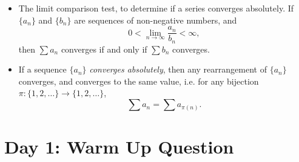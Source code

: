 \documentclass{exam}
\theoremstyle{problemstyle}
\newcommand{\1}[1]{\textbf{1}_{\left[#1\right]}} %
\begin{document}
\begin{itemize}
	\item The limit comparison test, to determine if a series converges absolutely. If $\{ a_n \}$ and $\{ b_n \}$ are sequences of non-negative numbers, and
	\[ 0 < \lim_{n \to \infty} \frac{a_n}{b_n} < \infty, \]
	then $\sum a_n$ converges if and only if $\sum b_n$ converges.

	\item If a sequence $\{ a_n \}$ \emph{converges absolutely}, then any rearrangement of $\{ a_n \}$ converges, and converges to the same value, i.e. for any bijection $\pi: \{ 1, 2, \dots \} \to \{ 1, 2, \dots \}$,
	\[ \sum a_n = \sum a_{\pi(n)}. \]
\end{itemize}

\newpage

\section*{Day 1: Warm Up Question}
\end{document}
